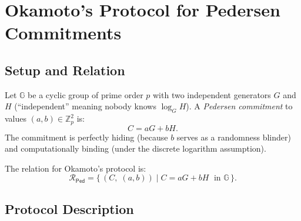 \documentclass[11pt]{article}
\theoremstyle{plain}
\theoremstyle{definition}
\newcommand{\Zp}{\mathbb{Z}_p}
\begin{document}
\section{Okamoto's Protocol for Pedersen Commitments}

\subsection{Setup and Relation}

Let $\mathbb{G}$ be a cyclic group of prime order $p$ with two independent generators $G$ and $H$ (``independent'' meaning nobody knows $\log_G H$). A \emph{Pedersen commitment} to values $(a, b) \in \Zp^2$ is:
\[
  C = aG + bH.
\]
The commitment is perfectly hiding (because $b$ serves as a randomness blinder) and computationally binding (under the discrete logarithm assumption).

The relation for Okamoto's protocol is:
\[
  \mathcal{R}_{\mathsf{Ped}} = \bigl\{\,(C,\; (a,b)) \;\big|\; C = aG + bH\;\text{ in }\mathbb{G}\,\bigr\}.
\]

\subsection{Protocol Description}
\end{document}
